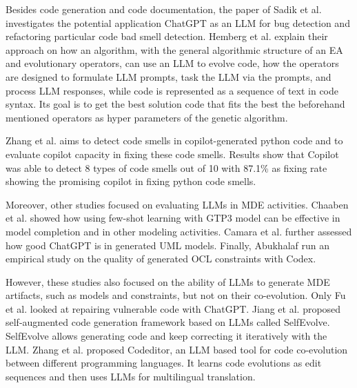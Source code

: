   Besides code generation and code documentation, the paper of Sadik et al. \cite{sadik2023analysis} investigates the potential application ChatGPT as an LLM for bug detection and refactoring particular code bad smell detection.
  Hemberg et al. \cite{hemberg2024evolving} explain their approach on how an algorithm, with the general algorithmic structure of an EA and evolutionary operators, can use an LLM to evolve code, how the operators are designed to formulate LLM prompts, task the LLM via the prompts, and process LLM responses, while code is represented as a sequence of text in code syntax. Its goal is to get the best solution code that fits the best the beforehand mentioned operators as hyper parameters of the genetic algorithm.
  
   Zhang et al.\cite{zhang2024copilot} aims to detect code smells in  copilot-generated python code and to evaluate copilot capacity in fixing these code smells. Results show that Copilot was able to detect 8 types of code smells out of 10 with 87.1\% as fixing rate showing the promising copilot in fixing python code smells.
  
 Moreover, other studies focused on evaluating LLMs in MDE activities. 
 Chaaben et al. \cite{chaaben2023towards} showed how using few-shot learning with GTP3 model can be effective in model completion and in other modeling activities. 
 Camara et al. \cite{camara2023assessment} further assessed how good ChatGPT is in generated UML models.
 Finally, Abukhalaf \cite{AbukhalafHK23} run an empirical study on the quality of generated OCL constraints with Codex.
 
 However, these studies also focused on the ability of LLMs to generate MDE artifacts, such as models and constraints, but not on their co-evolution. 
 Only Fu et al. \cite{fu2023chatgpt} looked at repairing vulnerable code with ChatGPT. 
 Jiang et al. \cite{jiang2023selfevolve} proposed self-augmented code generation framework based on LLMs called SelfEvolve. SelfEvolve allows generating code and keep correcting it iteratively with the LLM. %
 Zhang et al. \cite{zhang2023multilingual} proposed Codeditor, an LLM based tool for code co-evolution between different programming languages. It learns code evolutions as edit sequences and then uses LLMs for multilingual translation.
